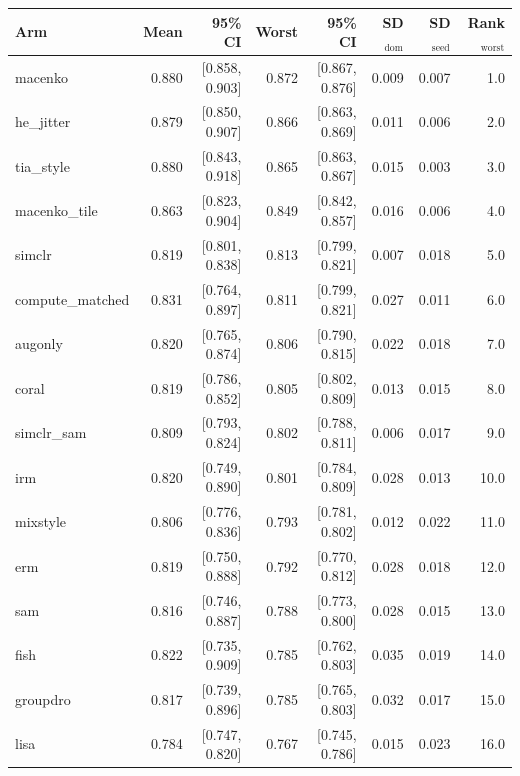 \begin{tabular}{lrrrrrrr}
\toprule
Arm & Mean & 95\% CI & Worst & 95\% CI & SD$_\text{dom}$ & SD$_\text{seed}$ & Rank$_\text{worst}$ \\
\midrule
macenko & 0.880 & [0.858, 0.903] & 0.872 & [0.867, 0.876] & 0.009 & 0.007 & 1.0 \\
he\_jitter & 0.879 & [0.850, 0.907] & 0.866 & [0.863, 0.869] & 0.011 & 0.006 & 2.0 \\
tia\_style & 0.880 & [0.843, 0.918] & 0.865 & [0.863, 0.867] & 0.015 & 0.003 & 3.0 \\
macenko\_tile & 0.863 & [0.823, 0.904] & 0.849 & [0.842, 0.857] & 0.016 & 0.006 & 4.0 \\
simclr & 0.819 & [0.801, 0.838] & 0.813 & [0.799, 0.821] & 0.007 & 0.018 & 5.0 \\
compute\_matched & 0.831 & [0.764, 0.897] & 0.811 & [0.799, 0.821] & 0.027 & 0.011 & 6.0 \\
augonly & 0.820 & [0.765, 0.874] & 0.806 & [0.790, 0.815] & 0.022 & 0.018 & 7.0 \\
coral & 0.819 & [0.786, 0.852] & 0.805 & [0.802, 0.809] & 0.013 & 0.015 & 8.0 \\
simclr\_sam & 0.809 & [0.793, 0.824] & 0.802 & [0.788, 0.811] & 0.006 & 0.017 & 9.0 \\
irm & 0.820 & [0.749, 0.890] & 0.801 & [0.784, 0.809] & 0.028 & 0.013 & 10.0 \\
mixstyle & 0.806 & [0.776, 0.836] & 0.793 & [0.781, 0.802] & 0.012 & 0.022 & 11.0 \\
erm & 0.819 & [0.750, 0.888] & 0.792 & [0.770, 0.812] & 0.028 & 0.018 & 12.0 \\
sam & 0.816 & [0.746, 0.887] & 0.788 & [0.773, 0.800] & 0.028 & 0.015 & 13.0 \\
fish & 0.822 & [0.735, 0.909] & 0.785 & [0.762, 0.803] & 0.035 & 0.019 & 14.0 \\
groupdro & 0.817 & [0.739, 0.896] & 0.785 & [0.765, 0.803] & 0.032 & 0.017 & 15.0 \\
lisa & 0.784 & [0.747, 0.820] & 0.767 & [0.745, 0.786] & 0.015 & 0.023 & 16.0 \\
\bottomrule
\end{tabular}
